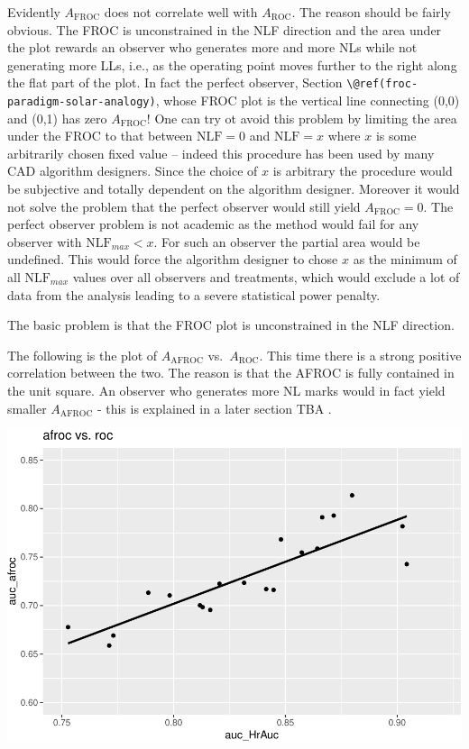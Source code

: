 \documentclass[
]{book}
\begin{document}
Evidently \(A_{\text{FROC}}\) does not correlate well with \(A_{\text{ROC}}\). The reason should be fairly obvious. The FROC is unconstrained in the NLF direction and the area under the plot rewards an observer who generates more and more NLs while not generating more LLs, i.e., as the operating point moves further to the right along the flat part of the plot. In fact the perfect observer, Section \texttt{\textbackslash{}@ref(froc-paradigm-solar-analogy)}, whose FROC plot is the vertical line connecting (0,0) and (0,1) has zero \(A_{\text{FROC}}\)! One can try ot avoid this problem by limiting the area under the FROC to that between \(\text{NLF} = 0\) and \(\text{NLF} = x\) where \(x\) is some arbitrarily chosen fixed value -- indeed this procedure has been used by many CAD algorithm designers. Since the choice of \(x\) is arbitrary the procedure would be subjective and totally dependent on the algorithm designer. Moreover it would not solve the problem that the perfect observer would still yield \(A_{\text{FROC}} = 0\). The perfect observer problem is not academic as the method would fail for any observer with \(\text{NLF}_{max} < x\). For such an observer the partial area would be undefined. This would force the algorithm designer to chose \(x\) as the minimum of all \(\text{NLF}_{max}\) values over all observers and treatments, which would exclude a lot of data from the analysis leading to a severe statistical power penalty.

The basic problem is that the FROC plot is unconstrained in the NLF direction.

The following is the plot of \(A_{\text{AFROC}}\) vs.~\(A_{\text{ROC}}\). This time there is a strong positive correlation between the two. The reason is that the AFROC is fully contained in the unit square. An observer who generates more NL marks would in fact yield smaller \(A_{\text{AFROC}}\) - this is explained in a later section TBA .

\includegraphics{03-empirical_files/figure-latex/unnamed-chunk-20-1.pdf}
\end{document}
